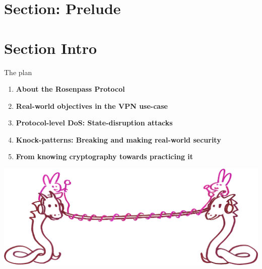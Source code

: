 \section{Section: Prelude}

\section{Section Intro}

\begin{frame}[c]{The plan}
  \centering
  \small

  \begin{enumerate}
    \item \textbf{About the Rosenpass Protocol}
    \item \textbf{Real-world objectives in the VPN use-case}
    \item \textbf{Protocol-level DoS: State-disruption attacks}
    \item \textbf{Knock-patterns: Breaking and making real-world security}
    \item \textbf{From knowing cryptography towards practicing it}
  \end{enumerate}

  \includegraphics[height=.4\textheight]{graphics/wireguard-and-rp-bunny-rose.png}
\end{frame}

